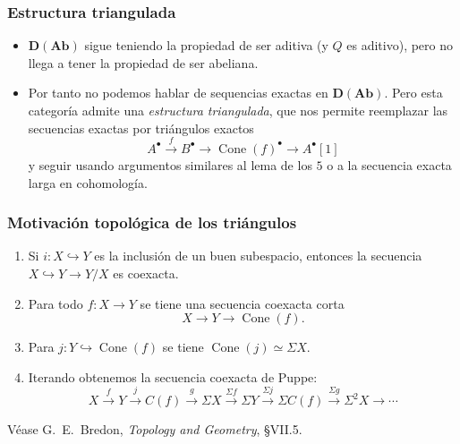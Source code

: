 \documentclass[12pt]{beamer}
\begin{document}
\begin{frame}
  \frametitle{Estructura triangulada}
  \begin{itemize}
    \item $\mathbf{D}(\mathbf{Ab})$ sigue teniendo la propiedad de ser aditiva (y $Q$ es aditivo), pero no llega a tener la propiedad de ser abeliana.
      \pause
    \item Por tanto no podemos hablar de sequencias exactas en $\mathbf{D}(\mathbf{Ab})$.
      \pause
      Pero esta categoría admite una \textit{estructura triangulada}, que nos permite reemplazar las secuencias exactas por triángulos exactos
      \[ A^{\bullet} \xrightarrow{f} B^{\bullet} \to \operatorname{Cone}(f)^{\bullet} \to A^{\bullet}[1] \]
      y seguir usando argumentos similares al lema de los $5$ o a la secuencia exacta larga en cohomología.
  \end{itemize}
\end{frame}

\begin{frame}
  \frametitle{Motivación topológica de los triángulos}
  \begin{enumerate}
    \item Si $i \colon X \hookrightarrow Y$ es la inclusión de un buen subespacio, entonces la secuencia $X \hookrightarrow Y \to Y/X$ es coexacta.
      \pause
    \item Para todo $f \colon X \to Y$ se tiene una secuencia coexacta corta
      \[ X \to Y \to \operatorname{Cone}(f). \]
      \pause
    \item Para $j \colon Y \hookrightarrow \operatorname{Cone}(f)$ se tiene $\operatorname{Cone}(j) \simeq \Sigma X$.
      \pause
    \item Iterando obtenemos la secuencia coexacta de Puppe:
      \[ X \xrightarrow{f} Y \xrightarrow{j} C(f) \xrightarrow{g} \Sigma X \xrightarrow{\Sigma f} \Sigma Y \xrightarrow{\Sigma j} \Sigma C(f) \xrightarrow{\Sigma g} \Sigma^{2} X \to \cdots \]
  \end{enumerate}
  Véase G.~E.~Bredon, \textit{Topology and Geometry}, \S VII.5.
\end{frame}
\end{document}
